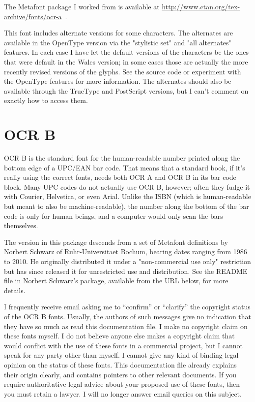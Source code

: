 \documentclass{article}
\begin{document}
The Metafont package I worked from is available at
\url{http://www.ctan.org/tex-archive/fonts/ocr-a}~.

This font includes alternate versions for some characters.  The alternates
are available in the OpenType version via the "stylistic set" and "all
alternates" features.  In each case I have let the default versions of the
characters be the ones that were default in the Wales version; in some cases
those are actually the more recently revised versions of the glyphs.  See
the source code or experiment with the OpenType features for more
information.  The alternates should also be available through the TrueType
and PostScript versions, but I can't comment on exactly how to access them.

\setmainfont{OCRB.otf}
\setmonofont{OCRB.otf}
\section{OCR B}

OCR B is the standard font for the human-readable number printed along the
bottom edge of a UPC/EAN bar code.  That means that a standard book, if it's
really using the correct fonts, needs both OCR A and OCR B in its bar code
block.  Many UPC codes do not actually use OCR B, however; often they fudge
it with Courier, Helvetica, or even Arial.  Unlike the ISBN (which is
human-readable but meant to also be machine-readable), the number
along the bottom of the bar code is only for human beings, and a computer
would only scan the bars themselves.

The version in this package descends from a set of Metafont definitions by
Norbert Schwarz of Ruhr-Universitaet Bochum, bearing dates ranging from 1986
to 2010.  He originally distributed it under a "non-commercial use only"
restriction but has since released it for unrestricted use and distribution. 
See the README file in Norbert Schwarz's package, available from the
URL below, for more details.

I frequently receive email asking me to ``confirm'' or ``clarify'' the
copyright status of the OCR B fonts.  Usually, the authors of such messages
give no indication that they have so much as read this documentation file. 
I make no copyright claim on these fonts myself.  I do not believe anyone
else makes a copyright claim that would conflict with the use of these fonts
in a commercial project, but I cannot speak for any party other than myself. 
I cannot give any kind of binding legal opinion on the status of these
fonts.  This documentation file already explains their origin clearly, and
contains pointers to other relevant documents.  If you require authoritative
legal advice about your proposed use of these fonts, then you must retain a
lawyer.  I will no longer answer email queries on this subject.
\end{document}
